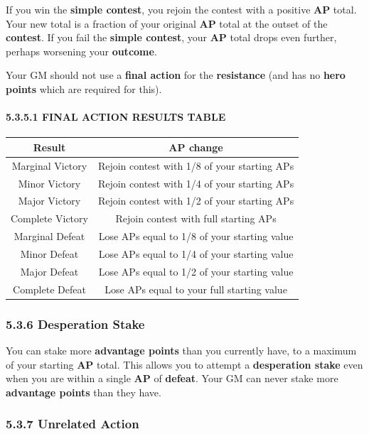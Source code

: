 \documentclass[
]{article}
\begin{document}
If you win the \textbf{simple contest}, you rejoin the contest with a
positive \textbf{AP} total. Your new total is a fraction of your
original \textbf{AP} total at the outset of the \textbf{contest}. If you
fail the \textbf{simple contest}, your \textbf{AP} total drops even
further, perhaps worsening your \textbf{outcome}.

Your GM should not use a \textbf{final action} for the
\textbf{resistance} (and has no \textbf{hero points} which are required
for this).

\hypertarget{final-action-results-table}{%
\paragraph{5.3.5.1 FINAL ACTION RESULTS
TABLE}\label{final-action-results-table}}

\begin{longtable}[]{@{}cc@{}}
\toprule
Result & AP change\tabularnewline
\midrule
\endhead
Marginal Victory & Rejoin contest with 1/8 of your starting
APs\tabularnewline
Minor Victory & Rejoin contest with 1/4 of your starting
APs\tabularnewline
Major Victory & Rejoin contest with 1/2 of your starting
APs\tabularnewline
Complete Victory & Rejoin contest with full starting APs\tabularnewline
Marginal Defeat & Lose APs equal to 1/8 of your starting
value\tabularnewline
Minor Defeat & Lose APs equal to 1/4 of your starting
value\tabularnewline
Major Defeat & Lose APs equal to 1/2 of your starting
value\tabularnewline
Complete Defeat & Lose APs equal to your full starting
value\tabularnewline
\bottomrule
\end{longtable}

\hypertarget{desperation-stake}{%
\subsubsection{5.3.6 Desperation Stake}\label{desperation-stake}}

You can stake more \textbf{advantage points} than you currently have, to
a maximum of your starting \textbf{AP} total. This allows you to attempt
a \textbf{desperation stake} even when you are within a single
\textbf{AP} of \textbf{defeat}. Your GM can never stake more
\textbf{advantage points} than they have.

\hypertarget{unrelated-action}{%
\subsubsection{5.3.7 Unrelated Action}\label{unrelated-action}}
\end{document}
